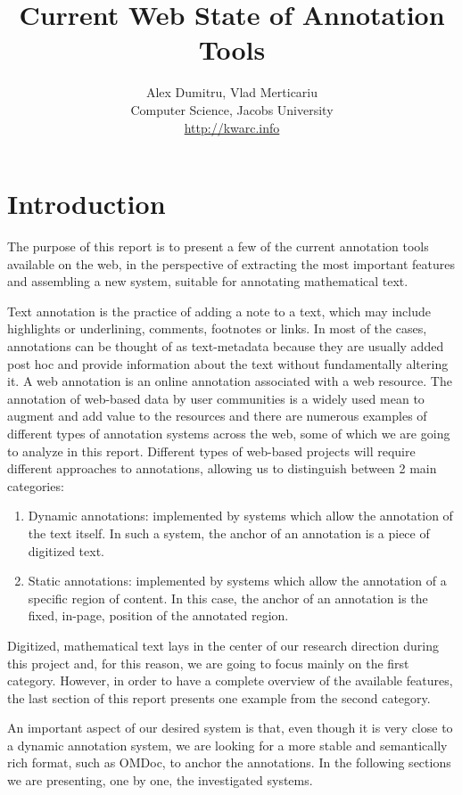\documentclass[11pt]{bluenote}
\title{Current Web State of Annotation Tools}
\author{Alex Dumitru, Vlad Merticariu\\Computer Science,  Jacobs University\\\url{http://kwarc.info}}
\begin{document}

\begin{abstract}
\end{abstract}
\tableofcontents\newpage


\section{Introduction}
The purpose of this report is to present a few of the current annotation tools available on the web, in the perspective of extracting the most important features and assembling a new system, suitable
for annotating mathematical text.\vspace{10pt}

Text annotation is the practice of adding a note to a text, which may include highlights or underlining, comments, footnotes or links. In most of the cases,
annotations can be thought of as text-metadata because they are usually added post hoc and provide information about the text without fundamentally altering it.\vspace{10pt}
A web annotation is an online annotation associated with a web resource. The annotation of web-based data by user communities is a widely used mean to augment and add value to the resources 
and there are numerous examples of different types of annotation systems across the web, some of which we are going to analyze in this report.  Different types of web-based projects will 
require different approaches to annotations, allowing us to distinguish between 2 main categories:
\begin{enumerate}
 \item Dynamic annotations: implemented by systems which allow the annotation of the text itself. In such a system, the anchor of an annotation is a piece of digitized text.
 \item Static annotations: implemented by systems which allow the annotation of a specific region of content. In this case, the anchor of an annotation is the fixed, in-page, position of
 the annotated region.
\end{enumerate}
Digitized, mathematical text lays in the center of our research direction during this project and, for this reason, we are going to focus mainly on the first category. However, in order to 
have a complete overview of the available features, the last section of this report presents one example from the second category.\vspace{10pt} %

An important aspect of our desired system is that, even though it is very close to a dynamic annotation system, we are looking for a more stable and semantically rich format, such as OMDoc, to anchor the annotations.
In the following sections we are presenting, one by one, the investigated systems.
 
\end{document}
